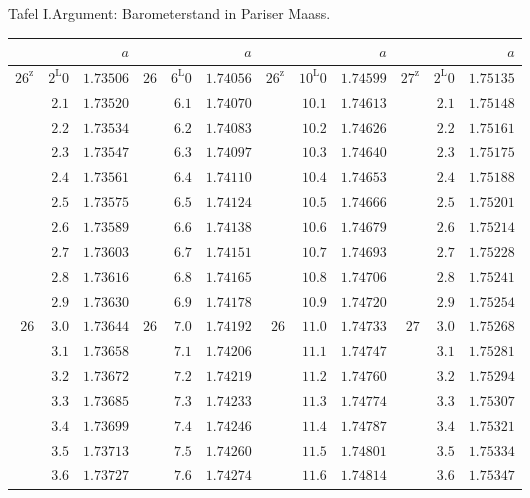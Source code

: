 \begin{GaussVIRefractionPlate}{Tafel I.\quad Argument: Barometerstand in Pariser Maass.}
{\fontsize{9}{10.2}\selectfont\setlength{\tabcolsep}{3pt}
\begin{tabular}{rr|r||rr|r||rr|r||rr|r}
&&$a$&&&$a$&&&$a$&&&$a$\\\hline
$26^{\mathrm{z}}$ & $2^{\mathrm{L}}0$ & $1.73506$ & $26$ & $6^{\mathrm{L}}0$ & $1.74056$ & $26^{\mathrm{z}}$ & $10^{\mathrm{L}}0$ & $1.74599$ & $27^{\mathrm{z}}$ & $2^{\mathrm{L}}0$ & $1.75135$\\
 & $2.1$ & $1.73520$ &  & $6.1$ & $1.74070$ &  & $10.1$ & $1.74613$ &  & $2.1$ & $1.75148$\\
 & $2.2$ & $1.73534$ &  & $6.2$ & $1.74083$ &  & $10.2$ & $1.74626$ &  & $2.2$ & $1.75161$\\
 & $2.3$ & $1.73547$ &  & $6.3$ & $1.74097$ &  & $10.3$ & $1.74640$ &  & $2.3$ & $1.75175$\\
 & $2.4$ & $1.73561$ &  & $6.4$ & $1.74110$ &  & $10.4$ & $1.74653$ &  & $2.4$ & $1.75188$\\
 & $2.5$ & $1.73575$ &  & $6.5$ & $1.74124$ &  & $10.5$ & $1.74666$ &  & $2.5$ & $1.75201$\\
 & $2.6$ & $1.73589$ &  & $6.6$ & $1.74138$ &  & $10.6$ & $1.74679$ &  & $2.6$ & $1.75214$\\
 & $2.7$ & $1.73603$ &  & $6.7$ & $1.74151$ &  & $10.7$ & $1.74693$ &  & $2.7$ & $1.75228$\\
 & $2.8$ & $1.73616$ &  & $6.8$ & $1.74165$ &  & $10.8$ & $1.74706$ &  & $2.8$ & $1.75241$\\
 & $2.9$ & $1.73630$ &  & $6.9$ & $1.74178$ &  & $10.9$ & $1.74720$ &  & $2.9$ & $1.75254$\\[4pt]
$26$ & $3.0$ & $1.73644$ & $26$ & $7.0$ & $1.74192$ & $26$ & $11.0$ & $1.74733$ & $27$ & $3.0$ & $1.75268$\\
 & $3.1$ & $1.73658$ &  & $7.1$ & $1.74206$ &  & $11.1$ & $1.74747$ &  & $3.1$ & $1.75281$\\
 & $3.2$ & $1.73672$ &  & $7.2$ & $1.74219$ &  & $11.2$ & $1.74760$ &  & $3.2$ & $1.75294$\\
 & $3.3$ & $1.73685$ &  & $7.3$ & $1.74233$ &  & $11.3$ & $1.74774$ &  & $3.3$ & $1.75307$\\
 & $3.4$ & $1.73699$ &  & $7.4$ & $1.74246$ &  & $11.4$ & $1.74787$ &  & $3.4$ & $1.75321$\\
 & $3.5$ & $1.73713$ &  & $7.5$ & $1.74260$ &  & $11.5$ & $1.74801$ &  & $3.5$ & $1.75334$\\
 & $3.6$ & $1.73727$ &  & $7.6$ & $1.74274$ &  & $11.6$ & $1.74814$ &  & $3.6$ & $1.75347$\\

\end{tabular}}
\end{GaussVIRefractionPlate}

